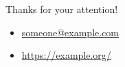 \begin{frame}[plain]{}
    \vspace{0.5cm}
    \begin{center}
        {\Large Thanks for your attention!}
    \end{center}
    \vfill
    \begin{itemize}
      \item[\faEnvelope] \href{mailto:someone@example.com}{someone@example.com} \\
      \item[\faLaptop] \href{https://example.org/}{https://example.org/}
    \end{itemize}
\end{frame}